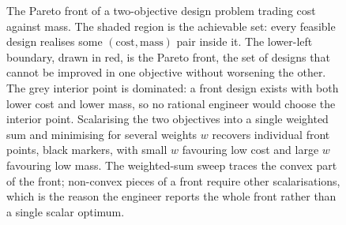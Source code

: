 \begin{figure}[ht]
\begin{tikzpicture}[x=1cm, y=1cm, font=\small]
\end{tikzpicture}
\caption[The Pareto front of a bi-objective design]{The Pareto front
of a two-objective design problem trading cost against mass. The shaded
region is the achievable set: every feasible design realises some
$(\text{cost}, \text{mass})$ pair inside it. The lower-left boundary,
drawn in red, is the Pareto front, the set of designs that cannot be
improved in one objective without worsening the other. The grey
interior point is dominated: a front design exists with both lower cost
and lower mass, so no rational engineer would choose the interior
point. Scalarising the two objectives into a single weighted sum and
minimising for several weights $w$ recovers individual front points,
black markers, with small $w$ favouring low cost and large $w$
favouring low mass. The weighted-sum sweep traces the convex part of
the front; non-convex pieces of a front require other scalarisations,
which is the reason the engineer reports the whole front rather than a
single scalar optimum.}
\label{fig:vol02:ch15:pareto-front}
\end{figure}
